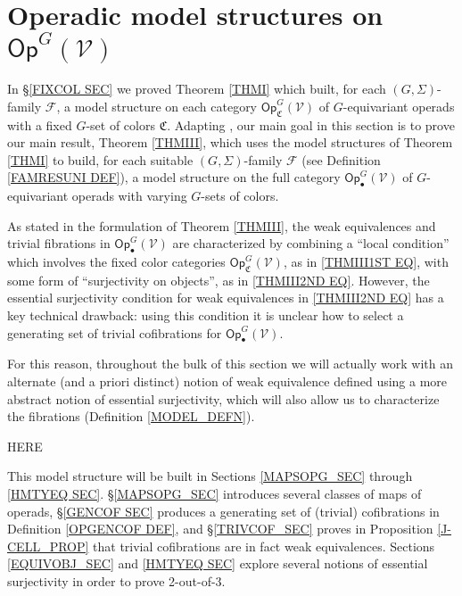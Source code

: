 \documentclass[a4paper,10pt
,draft
]{article}%
\numberwithin{equation}{section}
\numberwithin{figure}{section}
\theoremstyle{definition} %
\newcommand{\F}{\ensuremath{\mathcal F}}
\newcommand{\V}{\ensuremath{\mathcal V}}
\newcommand{\C}{\ensuremath{\mathcal C}}
\newcommand{\1}{\ensuremath{\mathbbm 1}}%
\begin{document}
\newpage


\section{Operadic model structures on $\mathsf{Op}^G(\mathcal{V})$}\label{MS_SEC}

\renewcommand{\C}{\mathfrak C}


In \S \ref{FIXCOL SEC} we proved Theorem \ref{THMI} which built, 
for each $(G,\Sigma)$-family $\F$,
a model structure on each category
$\mathsf{Op}_{\mathfrak{C}}^G(\V)$
of $G$-equivariant operads with a fixed $G$-set of colors $\mathfrak{C}$.
Adapting \cite{BM13,Cav,CM13b},
our main goal in this section is 
to prove our main result, Theorem \ref{THMIII},
which uses the model structures of Theorem \ref{THMI}
to build,
for each suitable $(G,\Sigma)$-family $\F$ 
(see Definition \ref{FAMRESUNI DEF}),
a model structure on the full category $\mathsf{Op}^G_\bullet(\mathcal{V})$
of $G$-equivariant operads with varying $G$-sets of colors. 


As stated in the formulation of Theorem \ref{THMIII},
the weak equivalences and trivial fibrations 
in $\mathsf{Op}^G_\bullet(\V)$
are characterized by combining
a ``local condition'' which involves the fixed color categories $\mathsf{Op}_{\mathfrak{C}}^G(\V)$,
as in \eqref{THMIII1ST EQ},
with some form of ``surjectivity on objects'',
as in \eqref{THMIII2ND EQ}.
However, the essential surjectivity condition for 
weak equivalences in \eqref{THMIII2ND EQ}
has a key technical drawback: 
using this condition 
it is unclear how to select a generating set of trivial cofibrations 
for $\mathsf{Op}^G_\bullet(\V)$.

For this reason, 
throughout the bulk of this section we will actually work with 
an alternate (and a priori distinct)
notion of weak equivalence
defined using a more abstract notion of essential surjectivity,
which will also allow us to characterize the fibrations (Definition \ref{MODEL_DEFN}).

{\color{blue} HERE}



This model structure will be built in Sections \ref{MAPSOPG_SEC} through \ref{HMTYEQ SEC}.
\S \ref{MAPSOPG_SEC} introduces several classes of maps of operads,
\S \ref{GENCOF SEC} produces a generating set of (trivial) cofibrations in Definition \ref{OPGENCOF DEF},
and \S \ref{TRIVCOF_SEC} proves in Proposition \ref{J-CELL_PROP} that trivial cofibrations are in fact weak equivalences.
Sections \ref{EQUIVOBJ_SEC} and \ref{HMTYEQ SEC} explore several notions of essential surjectivity in order to prove 2-out-of-3.
\end{document}
